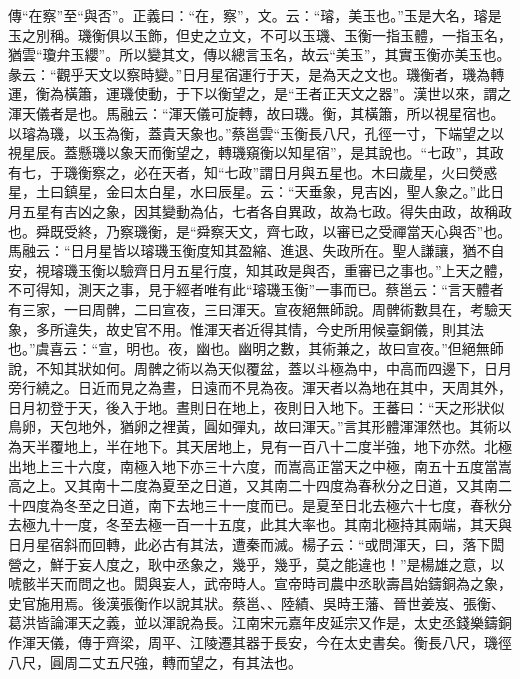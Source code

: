 {\noindent\zhuan{}\fzbyks 傳“在察”至“與否”。正義曰：“在，察”，文。云：“璿，美玉也。”玉是大名，璿是玉之別稱。璣衡俱以玉飾，但史之立文，不可以玉璣、玉衡一指玉體，一指玉名，猶雲“瓊弁玉纓”。所以變其文，傳以總言玉名，故云“美玉”，其實玉衡亦美玉也。彖云：“觀乎天文以察時變。”日月星宿運行于天，是為天之文也。璣衡者，璣為轉運，衡為橫簫，運璣使動，于下以衡望之，是“王者正天文之器”。漢世以來，謂之渾天儀者是也。馬融云：“渾天儀可旋轉，故曰璣。衡，其橫簫，所以視星宿也。以璿為璣，以玉為衡，蓋貴天象也。”蔡邕雲“玉衡長八尺，孔徑一寸，下端望之以視星辰。蓋懸璣以象天而衡望之，轉璣窺衡以知星宿”，是其說也。“七政”，其政有七，于璣衡察之，必在天者，知“七政”謂日月與五星也。木曰歲星，火曰熒惑星，土曰鎮星，金曰太白星，水曰辰星。云：“天垂象，見吉凶，聖人象之。”此日月五星有吉凶之象，因其變動為佔，七者各自異政，故為七政。得失由政，故稱政也。舜既受終，乃察璣衡，是“舜察天文，齊七政，以審已之受禪當天心與否”也。馬融云：“日月星皆以璿璣玉衡度知其盈縮、進退、失政所在。聖人謙讓，猶不自安，視璿璣玉衡以驗齊日月五星行度，知其政是與否，重審已之事也。”上天之體，不可得知，測天之事，見于經者唯有此“璿璣玉衡”一事而已。蔡邕云：“言天體者有三家，一曰周髀，二曰宣夜，三曰渾天。宣夜絕無師說。周髀術數具在，考驗天象，多所違失，故史官不用。惟渾天者近得其情，今史所用候臺銅儀，則其法也。”虞喜云：“宣，明也。夜，幽也。幽明之數，其術兼之，故曰宣夜。”但絕無師說，不知其狀如何。周髀之術以為天似覆盆，蓋以斗極為中，中高而四邊下，日月旁行繞之。日近而見之為晝，日遠而不見為夜。渾天者以為地在其中，天周其外，日月初登于天，後入于地。晝則日在地上，夜則日入地下。王蕃曰：“天之形狀似鳥卵，天包地外，猶卵之裡黃，圓如彈丸，故曰渾天。”言其形體渾渾然也。其術以為天半覆地上，半在地下。其天居地上，見有一百八十二度半強，地下亦然。北極出地上三十六度，南極入地下亦三十六度，而嵩高正當天之中極，南五十五度當嵩高之上。又其南十二度為夏至之日道，又其南二十四度為春秋分之日道，又其南二十四度為冬至之日道，南下去地三十一度而已。是夏至日北去極六十七度，春秋分去極九十一度，冬至去極一百一十五度，此其大率也。其南北極持其兩端，其天與日月星宿斜而回轉，此必古有其法，遭秦而滅。楊子云：“或問渾天，曰，落下閎營之，鮮于妄人度之，耿中丞象之，幾乎，幾乎，莫之能違也！”是楊雄之意，以唬骸半天而問之也。閎與妄人，武帝時人。宣帝時司農中丞耿壽昌始鑄銅為之象，史官施用焉。後漢張衡作以說其狀。蔡邕、、陸績、吳時王藩、晉世姜岌、張衡、葛洪皆論渾天之義，並以渾說為長。江南宋元嘉年皮延宗又作是，太史丞錢樂鑄銅作渾天儀，傳于齊梁，周平、江陵遷其器于長安，今在太史書矣。衡長八尺，璣徑八尺，圓周二丈五尺強，轉而望之，有其法也。 \par}

